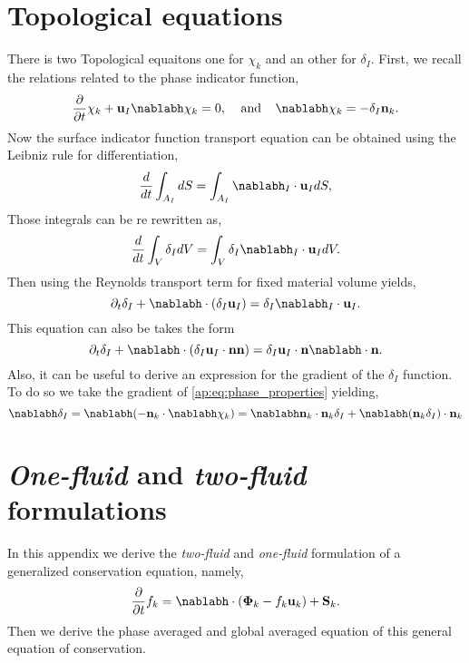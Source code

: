\section{Topological equations}
There is two Topological equaitons one for $\chi_k$ and an other for $\delta_I$.
First, we recall the relations related to the phase indicator function, 
\begin{equation}
    \frac{\partial}{\partial t} \chi_k
    + \textbf{u}_I  \nablabh \chi_k 
    = 0, \;\;\;\;\text{and}\;\;\;\; 
    \nablabh \chi_k 
    = - \delta_I \textbf{n}_k.
    \label{ap:eq:phase_properties}
\end{equation}
Now the surface indicator function transport equation can be obtained using the Leibniz rule for differentiation,  
\begin{equation*}
    \ddt \int_{A_I} dS
    = \int_{A_I} \nablabh_I \cdot \textbf{u}_I dS,
\end{equation*}
Those integrals can be re rewritten as, 
\begin{equation*}
    \ddt \int_{V} \delta_I dV
    = \int_{V} \delta_I \nablabh_I \cdot \textbf{u}_I dV.
\end{equation*}
Then using the Reynolds transport term for fixed material volume yields,
\begin{equation*}
    \pddt \delta_I
    + \nablabh \cdot (\delta_I \textbf{u}_I)
    = \delta_I \nablabh_I \cdot \textbf{u}_I. 
\end{equation*}
This equation can also be takes the form 
\begin{equation}
    \pddt \delta_I
    + \nablabh \cdot (\delta_I \textbf{u}_I\cdot \textbf{n}\textbf{n})
    = \delta_I \textbf{u}_I \cdot \textbf{n}\nablabh \cdot \textbf{n}. 
    \label{ap:eq:dt_delta_I}
\end{equation}
Also, it can be useful to derive an expression for the gradient of the $\delta_I$ function. 
To do so we take the gradient of \ref{ap:eq:phase_properties} yielding, 
\begin{equation*}
    \nablabh\delta_I 
    = \nablabh( - \textbf{n}_k \cdot \nablabh \chi_k)
    = \nablabh\textbf{n}_k \cdot \textbf{n}_k \delta_I
    + \nablabh(\textbf{n}_k \delta_I) \cdot \textbf{n}_k 
\end{equation*}

\section{\textit{One-fluid} and \textit{two-fluid} formulations}
In this appendix we derive the \textit{two-fluid} and \textit{one-fluid} formulation of a generalized conservation equation, namely,
\begin{equation}
    \frac{\partial}{\partial t} f_k
    = \nablabh \cdot (\bm{\Phi}_k - f_k\textbf{u}_k)
    + \textbf{S}_k.
    \label{ap:eq:global_balance}
\end{equation}
Then we derive the phase averaged and global averaged equation of this general equation of conservation. 

